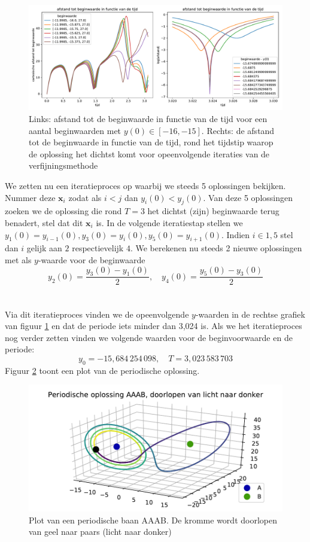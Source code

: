 \documentclass[12pt, a4paper]{article}
\newcommand{\x}{\textbf{x}}
\theoremstyle{definition}
\begin{document}
\begin{figure}[h]
    \centering
    \includegraphics[width=\linewidth]{afstand_beginwaarde_opdracht4.pdf}
    \caption{Links: afstand tot de beginwaarde in functie van de tijd voor een aantal beginwaarden met $y(0) \in [-16, -15]$. Rechts: de afstand tot de beginwaarde in functie van de tijd, rond het tijdstip waarop de oplossing het dichtst komt voor opeenvolgende iteraties van de verfijningsmethode}
    \label{fig: afstand}
\end{figure}

 We zetten nu een iteratieproces op waarbij we steeds 5 oplossingen bekijken. Nummer deze $\x_i$ zodat als $i<j$ dan $y_i(0) < y_j(0)$. Van deze 5 oplossingen zoeken we de oplossing die rond $T=3$ het dichtst (zijn) beginwaarde terug benadert, stel dat dit $\x_i$ is. In de volgende iteratiestap stellen we $y_1(0) = y_{i-1}(0), y_3(0) = y_i(0), y_5(0)=y_{i+1}(0)$. Indien $i \in {1,5}$ stel dan $i$ gelijk aan $2$ respectievelijk $4$. We berekenen nu steeds 2 nieuwe oplossingen met als $y$-waarde voor de beginwaarde $$y_2(0) = \frac{y_3(0)-y_1(0)}{2}, \quad y_4(0) = \frac{y_5(0)-y_3(0)}{2}$$\\
\\
Via dit iteratieproces vinden we de opeenvolgende $y$-waarden in de rechtse grafiek van figuur \ref{fig: afstand} en dat de periode iets minder dan 3,024 is. Als we het iteratieproces nog verder zetten vinden we volgende waarden voor de beginvoorwaarde en de periode:
$$y_0 = -15,684\, 254 \, 098 , \quad T=3,023 \, 583 \, 703$$
Figuur \ref{fig: AAAB} toont een plot van de periodische oplossing.

\begin{figure}[h]
    \centering
    \includegraphics[width=0.8\linewidth]{periodische_baan_AAAB_opdracht4.pdf}
    \caption{Plot van een periodische baan AAAB. De kromme wordt doorlopen van geel naar paars (licht naar donker)}
    \label{fig: AAAB}
\end{figure}
\end{document}
